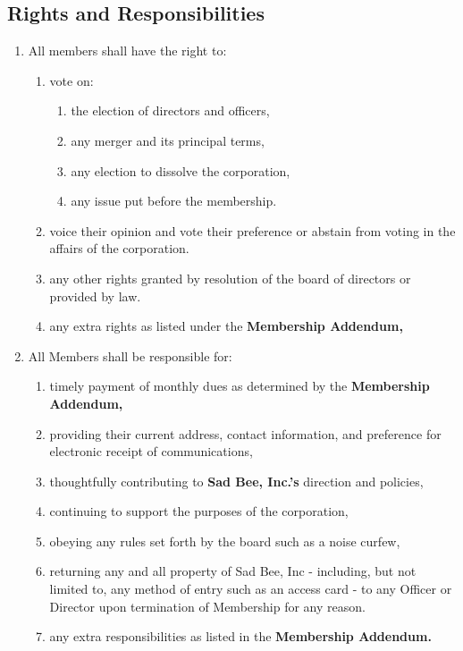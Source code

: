 \documentclass{article}
\begin{document}
\subsection{Rights and Responsibilities}
\begin{enumerate}
    \item All members shall have the right to:
    \begin{enumerate}
        \item vote on:
        \begin{enumerate}
            \item the election of directors and officers,
            \item any merger and its principal terms,
            \item any election to dissolve the corporation,
            \item any issue put before the membership.
        \end{enumerate}
        \item voice their opinion and vote their preference or abstain from voting
        in the affairs of the corporation.
        \item any other rights granted by resolution of the board of directors or
        provided by law.
        \item any extra rights as listed under the \textbf{Membership Addendum,}

    \end{enumerate}
    \item All Members shall be responsible for:
    \begin{enumerate}
        \item timely payment of monthly dues as determined by the \textbf{Membership Addendum,}
        \item providing their current address, contact information, and
        preference for electronic receipt of communications,
        \item thoughtfully contributing to \textbf{Sad Bee, Inc.'s} direction and
    policies,
        \item continuing to support the purposes of the corporation,
        \item obeying any rules set forth by the board such as a noise curfew,
        \item returning any and all property of Sad Bee, Inc - including, but not
    limited to, any method of entry such as an access card - to any Officer or
    Director upon termination of Membership for any reason.
        \item any extra responsibilities as listed in the \textbf{Membership Addendum.}
    \end{enumerate}
\end{enumerate}
\end{document}
